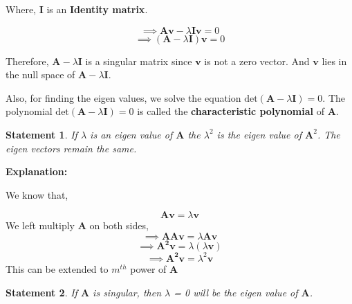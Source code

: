 \documentclass[a4paper]{article}
\newtheorem{statement}{Statement}
\begin{document}
        Where, $\mathbf{I}$ is an \textbf{Identity matrix}.
        
        \begin{equation*}
            \implies \mathbf{Av}-\lambda\mathbf{I}\mathbf{v} = 0
        \end{equation*}
        \begin{equation*}
            \implies(\mathbf{A} - \lambda\mathbf{I})\mathbf{v} = 0
        \end{equation*}
        
        Therefore, $\mathbf{A}-\lambda\mathbf{I}$ is a singular matrix since $\mathbf{v}$ is not a zero vector. And $\mathbf{v}$ lies in the null space of $\mathbf{A}-\lambda\mathbf{I}$.  
        
        Also, for finding the eigen values, we solve the equation $\text{det}(\mathbf{A}-\lambda\mathbf{I}) = 0$. The polynomial $\text{det}(\mathbf{A}-\lambda\mathbf{I}) = 0$ is called the \textbf{characteristic polynomial} of $\mathbf{A}$.
            
        \begin{statement}
            If $\lambda$ is an eigen value of  $\mathbf{A}$ the $\lambda^{2}$ is the eigen value of $\mathbf{A}^{2}$. The eigen vectors remain the same.
        \end{statement}
        
        \textbf{Explanation:}
        
        We know that,
        
        \begin{equation*}
            \mathbf{Av} = \lambda\mathbf{v}
        \end{equation*}
        We left multiply $\mathbf{A}$ on both sides,
        \begin{equation*}
            \implies \mathbf{AAv} = \lambda\mathbf{Av}
        \end{equation*}
        \begin{equation*}
            \implies \mathbf{A^2v} = \lambda(\lambda\mathbf{v})
        \end{equation*}
        \begin{equation*}
            \implies \mathbf{A^2v} = \lambda^2\mathbf{v}
        \end{equation*}
    This can be extended to $m^{th}$ power of $\mathbf{A}$
    
    \begin{statement}
        If $\mathbf{A}$ is singular, then $\lambda$ = 0 will be the eigen value of $\mathbf{A}$.
    \end{statement}
        
\end{document}
